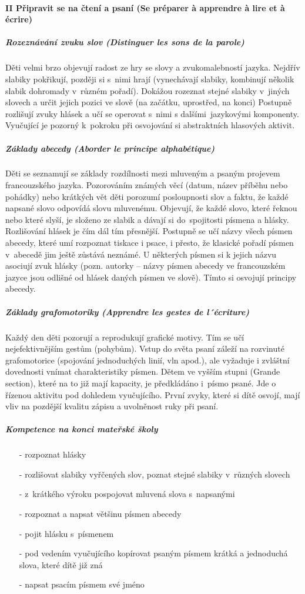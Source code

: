 			\paragraph*{II Připravit se na čtení a psaní (Se préparer à apprendre à lire et à écrire)}
				\subparagraph{Rozeznávání zvuku slov (Distinguer les sons de la parole)}
					Děti velmi brzo objevují radost ze hry se slovy a zvukomalebností jazyka. Nejdřív slabiky pokřikují, později si s nimi hrají (vynechávají slabiky, kombinují několik slabik dohromady v různém pořadí). Dokážou rozeznat stejné slabiky v jiných slovech a určit jejich pozici ve slově (na začátku, uprostřed, na konci)
					Postupně rozlišují zvuky hlásek a učí se operovat s nimi s dalšími jazykovými komponenty. Vyučující je pozorný k pokroku při osvojování si abstraktních hlasových aktivit.
				\subparagraph{Základy abecedy (Aborder le principe alphabétique)}
					Děti se seznamují se základy rozdílnosti mezi mluveným a psaným projevem francouzského jazyka. Pozorováním známých věcí (datum, název příběhu nebo pohádky) nebo krátkých vět děti porozumí posloupnosti slov a faktu, že každé napsané slovo odpovídá slovu mluvenému. 
					Objevují, že každé slovo, které řeknou nebo které slyší, je složeno ze slabik a dávají si do spojitosti písmena a hlásky. Rozlišování hlásek je čím dál tím přesnější. Postupně se učí názvy všech písmen abecedy, které umí rozpoznat tiskace i psace, i přesto, že klasické pořadí písmen v abecedě jim ještě zůstává neznámé. U některých písmen si k jejich názvu asociují zvuk hlásky (pozn. autorky – názvy písmen abecedy ve francouzském jazyce jsou odlišné od hlásek daných písmen ve slově). Tímto si osvojují principy abecedy.
				\subparagraph{Základy grafomotoriky (Apprendre les gestes de l´écriture)} 
					Každý den děti pozorují a reprodukují grafické motivy. Tím se učí nejefektivnějším gestům (pohybům). Vstup do světa psaní záleží na rozvinuté grafomotorice (spojování jednoduchých linií, vln apod.), ale vyžaduje i zvláštní dovednosti vnímat charakteristiky písmen. 
					Dětem ve vyšším stupni (Grande section), které na to již mají kapacity, je předkládáno i písmo psané. Jde o řízenou aktivitu pod dohledem vyučujícího. První zvyky, které si dítě osvojí, mají vliv na pozdější kvalitu zápisu a uvolněnost ruky při psaní. 
					
					\subparagraph{Kompetence na konci mateřské školy}
					\begin{itemize}
						\setlength\itemsep{-2mm}
						\item[-] rozpoznat hlásky
						\item[-] rozlišovat slabiky vyřčených slov, poznat stejné slabiky v různých slovech
						\item[-] z krátkého výroku pospojovat mluvená slova s napsanými
						\item[-] rozpoznat a napsat většinu písmen abecedy
						\item[-] pojit hlásku s písmenem
						\item[-] pod vedením vyučujícího kopírovat psaným písmem krátká a jednoduchá slova, které dítě již zná
						\item[-] napsat psacím písmem své jméno
					\end{itemize}


